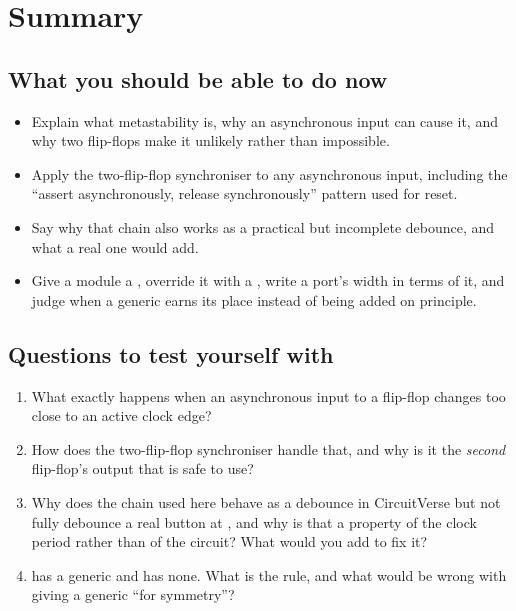 
\section{Summary}
\label{c4:sec:review}

\subsection*{What you should be able to do now}
\begin{itemize}
  \item Explain what metastability is, why an asynchronous input can cause it, and why two
    flip-flops make it unlikely rather than impossible.
  \item Apply the two-flip-flop synchroniser to any asynchronous input, including the ``assert
    asynchronously, release synchronously'' pattern used for reset.
  \item Say why that chain also works as a practical but incomplete debounce, and what a real one
    would add.
  \item Give a module a , override it with a , write a port's width
    in terms of it, and judge when a generic earns its place instead of being added on principle.
\end{itemize}

\subsection*{Questions to test yourself with}
\begin{enumerate}
  \item What exactly happens when an asynchronous input to a flip-flop changes too close to an
    active clock edge?
  \item How does the two-flip-flop synchroniser handle that, and why is it the \emph{second}
    flip-flop's output that is safe to use?
  \item Why does the chain used here behave as a debounce in CircuitVerse but not fully debounce a
    real button at , and why is that a property of the clock period rather than of the
    circuit? What would you add to fix it?
  \item {} has a generic and  has none. What is the rule, and what
    would be wrong with giving  a  generic ``for symmetry''?
\end{enumerate}

